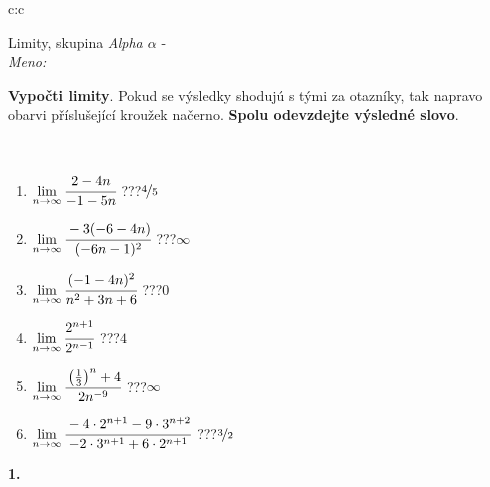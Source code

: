 \documentclass[10pt]{report}
\begin{document}
\thispagestyle{empty}
\begin{tabular}{c:c}
\begin{minipage}[c][104.5mm][t]{0.5\linewidth}
\begin{center}
\vspace{7mm}
{\huge Limity, skupina \textit{Alpha $\alpha$} -}\\[5mm]
\textit{Meno:}\phantom{xxxxxxxxxxxxxxxxxxxxxxxxxxxxxxxxxxxxxxxxxxxxxxxxxxxxxxxxxxxxxxxxx}\\[5mm]
\begin{minipage}{0.95\linewidth}
\begin{center}
\textbf{Vypočti limity}. Pokud se výsledky shodujú s tými za otazníky, tak napravo\\obarvi příslušející kroužek načerno. \textbf{Spolu odevzdejte výsledné slovo}.
\end{center}
\end{minipage}
\\[1mm]
\begin{minipage}{0.79\linewidth}
\begin{center}
\begin{varwidth}{\linewidth}
\begin{enumerate}
\normalsize
\item $\lim\limits_{n\to\infty}\cfrac{2-4n}{-1-5n}$\quad \dotfill\; ???\;\dotfill \quad $\nicefrac{4}{5}$
\item $\lim\limits_{n\to\infty}\cfrac{-3(-6-4n)}{(-6n-1)^2}$\quad \dotfill\; ???\;\dotfill \quad $\infty$
\item $\lim\limits_{n\to\infty}\cfrac{(-1-4n)^2}{n^2+3n+6}$\quad \dotfill\; ???\;\dotfill \quad $0$
\item $\lim\limits_{n\to\infty}\cfrac{2^{n+1}}{2^{n-1}}$\quad \dotfill\; ???\;\dotfill \quad $4$
\item $\lim\limits_{n\to\infty}\cfrac{\left(\frac{1}{3}\right)^n +4}{2n^{-9}}$\quad \dotfill\; ???\;\dotfill \quad $\infty$
\item $\lim\limits_{n\to\infty}\cfrac{-4\cdot 2^{n+1}-9\cdot 3^{n+2}}{-2\cdot 3^{n+1}+6\cdot 2^{n+1}}$\quad \dotfill\; ???\;\dotfill \quad $\nicefrac{3}{2}$
\end{enumerate}
\end{varwidth}
\end{center}
\end{minipage}
\begin{minipage}{0.20\linewidth}
\begin{center}
{\Huge\bfseries 1.} \\[2mm]

\end{center}
\end{minipage}
\end{center}
\end{minipage}
\end{tabular}
\end{document}
